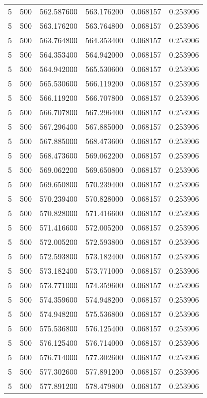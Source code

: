 \begin{longtable}{rrrrrr}
5 & 500 & 562.587600 & 563.176200 & 0.068157 & 0.253906 \\
5 & 500 & 563.176200 & 563.764800 & 0.068157 & 0.253906 \\
5 & 500 & 563.764800 & 564.353400 & 0.068157 & 0.253906 \\
5 & 500 & 564.353400 & 564.942000 & 0.068157 & 0.253906 \\
5 & 500 & 564.942000 & 565.530600 & 0.068157 & 0.253906 \\
5 & 500 & 565.530600 & 566.119200 & 0.068157 & 0.253906 \\
5 & 500 & 566.119200 & 566.707800 & 0.068157 & 0.253906 \\
5 & 500 & 566.707800 & 567.296400 & 0.068157 & 0.253906 \\
5 & 500 & 567.296400 & 567.885000 & 0.068157 & 0.253906 \\
5 & 500 & 567.885000 & 568.473600 & 0.068157 & 0.253906 \\
5 & 500 & 568.473600 & 569.062200 & 0.068157 & 0.253906 \\
5 & 500 & 569.062200 & 569.650800 & 0.068157 & 0.253906 \\
5 & 500 & 569.650800 & 570.239400 & 0.068157 & 0.253906 \\
5 & 500 & 570.239400 & 570.828000 & 0.068157 & 0.253906 \\
5 & 500 & 570.828000 & 571.416600 & 0.068157 & 0.253906 \\
5 & 500 & 571.416600 & 572.005200 & 0.068157 & 0.253906 \\
5 & 500 & 572.005200 & 572.593800 & 0.068157 & 0.253906 \\
5 & 500 & 572.593800 & 573.182400 & 0.068157 & 0.253906 \\
5 & 500 & 573.182400 & 573.771000 & 0.068157 & 0.253906 \\
5 & 500 & 573.771000 & 574.359600 & 0.068157 & 0.253906 \\
5 & 500 & 574.359600 & 574.948200 & 0.068157 & 0.253906 \\
5 & 500 & 574.948200 & 575.536800 & 0.068157 & 0.253906 \\
5 & 500 & 575.536800 & 576.125400 & 0.068157 & 0.253906 \\
5 & 500 & 576.125400 & 576.714000 & 0.068157 & 0.253906 \\
5 & 500 & 576.714000 & 577.302600 & 0.068157 & 0.253906 \\
5 & 500 & 577.302600 & 577.891200 & 0.068157 & 0.253906 \\
5 & 500 & 577.891200 & 578.479800 & 0.068157 & 0.253906 \\

\end{longtable}
